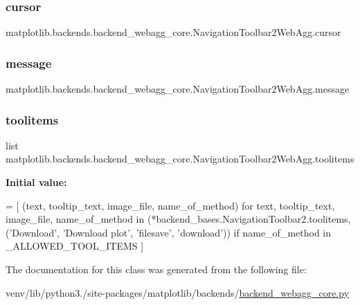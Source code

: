 \subsubsection{\texorpdfstring{cursor}{cursor}}
{\footnotesize\ttfamily matplotlib.\+backends.\+backend\+\_\+webagg\+\_\+core.\+Navigation\+Toolbar2\+Web\+Agg.\+cursor}

\mbox{\label{classmatplotlib_1_1backends_1_1backend__webagg__core_1_1NavigationToolbar2WebAgg_a7596a1f4a668afbe894549bb13d7571d}} 
\subsubsection{\texorpdfstring{message}{message}}
{\footnotesize\ttfamily matplotlib.\+backends.\+backend\+\_\+webagg\+\_\+core.\+Navigation\+Toolbar2\+Web\+Agg.\+message}

\mbox{\label{classmatplotlib_1_1backends_1_1backend__webagg__core_1_1NavigationToolbar2WebAgg_a9eb73fab0d93bd7dd2de76fb75b6ab40}} 
\subsubsection{\texorpdfstring{toolitems}{toolitems}}
{\footnotesize\ttfamily list matplotlib.\+backends.\+backend\+\_\+webagg\+\_\+core.\+Navigation\+Toolbar2\+Web\+Agg.\+toolitems\hspace{0.3cm}{\ttfamily [static]}}

{\bfseries Initial value\+:}
\begin{DoxyCode}
=  [
        (text, tooltip\_text, image\_file, name\_of\_method)
        \textcolor{keywordflow}{for} text, tooltip\_text, image\_file, name\_of\_method
        \textcolor{keywordflow}{in} (*backend\_bases.NavigationToolbar2.toolitems,
            (\textcolor{stringliteral}{'Download'}, \textcolor{stringliteral}{'Download plot'}, \textcolor{stringliteral}{'filesave'}, \textcolor{stringliteral}{'download'}))
        \textcolor{keywordflow}{if} name\_of\_method \textcolor{keywordflow}{in} \_ALLOWED\_TOOL\_ITEMS
    ]
\end{DoxyCode}


The documentation for this class was generated from the following file\+:\begin{DoxyCompactItemize}
\item 
venv/lib/python3./site-\/packages/matplotlib/backends/\hyperlink{backend__webagg__core_8py}{backend\+\_\+webagg\+\_\+core.\+py}\end{DoxyCompactItemize}
